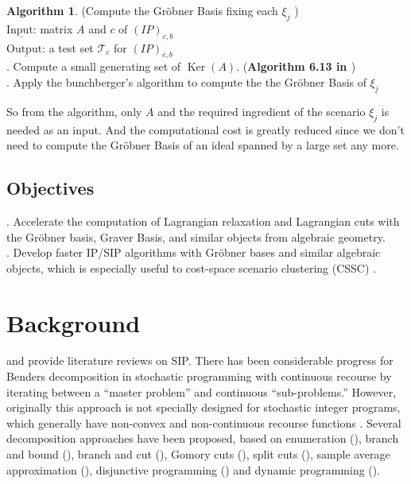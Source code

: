 \documentclass{article}
\theoremstyle{plain}
\theoremstyle{definition}
\newtheorem{algorithm}[theorem]{Algorithm}
\begin{document}
\begin{algorithm} (Compute the Gröbner Basis fixing each $\xi_j$ ) \\
$\underline{\text{Input:}}$ matrix $A$ and $c$ of $(I P)_{c, b}$  \\
$\underline{\text {Output:}} $ a test set  $\mathcal{T}_{c}$  for  $(I P)_{c, b}$ \\
. Compute a small generating set of $\operatorname{Ker}(A)$. (\textbf{Algorithm 6.13 in \cite{Yuchen1}})\\
. Apply the bunchberger’s algorithm to compute the the Gröbner Basis of  $\xi_j$
\end{algorithm}

So from the algorithm, only $A$ and the required ingredient of the scenario $\xi_j$ is needed as an input. And the computational cost is greatly reduced since we don't need to compute the Gröbner Basis of an ideal spanned by a large set any more. 

\subsection{Objectives}
. Accelerate the computation of Lagrangian relaxation and Lagrangian cuts with the Gröbner basis, Graver Basis, and similar objects from algebraic geometry.\\
. Develop faster IP/SIP algorithms with Gröbner bases and similar algebraic objects, which is especially useful to cost-space scenario clustering (CSSC) \cite{Scenario Clustering}.\\ 

\section{Background}

\cite{Louveaux and Schultz (2003)} and \cite{Sen (2005)} provide literature reviews on SIP. There has been considerable progress for Benders decomposition in stochastic programming with continuous recourse \cite{Benders 1962} by iterating between a “master problem” and continuous “sub-problems.” However, originally this approach is not specially designed for stochastic integer programs, which generally have non-convex and non-continuous recourse functions \cite{Schultz 1993}. Several decomposition approaches have been proposed, based on enumeration (\cite{Schultz et al. 1998}), branch and bound (\cite{Ahmed et al. 2004}), branch and cut (\cite{Sen and Sherali 2006}), Gomory cuts (\cite{Zhang and Kucukyavuz 2014}), split cuts (\cite{Sen and Higle 2005}), sample average approximation (\cite{Kleywegt et al. 2001}), disjunctive programming (\cite{Ntaimo 2010}) and dynamic programming (\cite{Zou et al. 2017}). 
\end{document}

